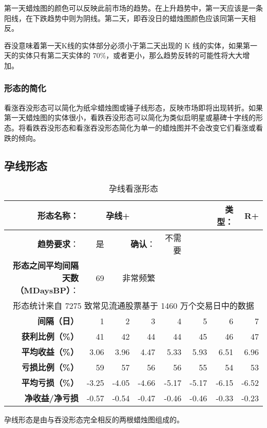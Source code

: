 第一天蜡烛图的颜色可以反映此前市场的趋势。在上升趋势中，第一天应该是一条阳线，在下跌趋势中则为阴线。第二天，即吞没日的蜡烛图颜色应该同第一天相反。

吞没意味着第一天K线的实体部分必须小于第二天出现的 K 线的实体，如果第一天的实体只有第二天实体的 70\%，或者更小，那么趋势反转的可能性将大大增加。
\subsubsection*{形态的简化}
看涨吞没形态可以简化为纸伞蜡烛图或锤子线形态，反映市场即将出现转折。如果第一天蜡烛图的实体很小，看跌吞没形态可以简化为类似启明星或墓碑十字线的形态。将看跌吞没形态和看涨吞没形态简化为单一的蜡烛图并不会改变它们看涨或看跌的倾向。
\subsection{孕线形态}
\begin{table}[!ht]
    \centering
    \caption{孕线看涨形态}
    \begin{tabular}{|r|r|r|r|r|r|r|r|}
        \hline
        \textbf{形态名称}：                & \multicolumn{2}{r}{孕线+} & ~                                 & ~     & ~     & \textbf{类型}： & R+            \\ \hline
        \textbf{趋势要求}：                & 是                       & \multicolumn{2}{r|}{\textbf{确认}：} & 不需要   & ~     & ~            & ~             \\ \hline
        \textbf{形态之间平均间隔天数（MDaysBP）}： & 69                      & \multicolumn{2}{r|}{非常频繁}         & ~     & ~     & ~            & ~             \\ \hline
        \multicolumn{8}{|c|}{形态统计来自 7275 致常见流通股票基于 1460 万个交易日中的数据}                                                                                 \\ \hline
        \textbf{间隔（日）}                & 1                       & 2                                 & 3     & 4     & 5            & 6     & 7     \\ \hline
        \textbf{获利比例（\%）}             & 41                      & 42                                & 44    & 44    & 45           & 46    & 47    \\ \hline
        \textbf{平均收益（\%）}             & 3.06                    & 3.96                              & 4.47  & 5.33  & 5.93         & 6.51  & 6.96  \\ \hline
        \textbf{亏损比例（\%）}             & 59                      & 57                                & 56    & 56    & 55           & 54    & 53    \\ \hline
        \textbf{平均亏损（\%）}             & -3.25                   & -4.05                             & -4.66 & -5.17 & -5.17        & -6.15 & -6.52 \\ \hline
        \textbf{净收益/净亏损 }             & -0.57                   & -0.54                             & -0.47 & -0.46 & -0.46        & -0.33 & -0.23 \\ \hline
    \end{tabular}
\end{table}
孕线形态是由与吞没形态完全相反的两根蜡烛图组成的。
